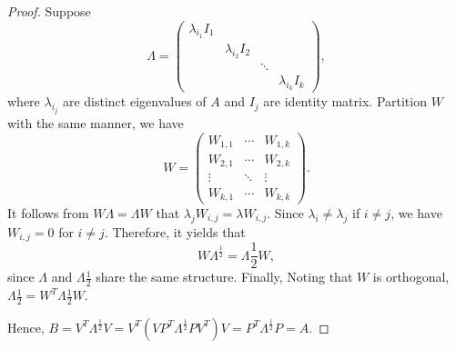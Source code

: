 \begin{proof}
Suppose 
\begin{equation*}
    \Lambda = \begin{pmatrix}
        \lambda_{i_1}I_1 &                  &        &                   \\
                         & \lambda_{i_2}I_2 &        &                   \\
                         &                  & \ddots &                   \\
                         &                  &        & \lambda_{i_k}I_k
    \end{pmatrix},
\end{equation*}
where $\lambda_{i_j}$ are distinct eigenvalues of $A$ and $I_j$ are 
identity matrix. Partition $W$ with the same manner, we have 
\begin{equation*}
    W = \begin{pmatrix}
        W_{1, 1}   &    \cdots    &  W_{1, k}         \\
        W_{2, 1}   &    \cdots    &  W_{2, k}         \\
        \vdots     &    \ddots    &  \vdots           \\
        W_{k, 1}   &    \cdots    &  W_{k, k}
    \end{pmatrix}.
\end{equation*}
It follows from $W \Lambda = \Lambda W$ that $\lambda_j W_{i, j} = \lambda
W_{i, j}$. Since $\lambda_i \neq \lambda_j$ if $i \neq j$, we have 
$W_{i, j} = 0$ for $i \neq j$. Therefore, it yields that 
\begin{equation}
    W\Lambda^\frac{1}{2} = \Lambda\frac{1}{2}W, 
\end{equation}
since $\Lambda$ and $\Lambda\frac{1}{2}$ share the same structure. Finally, 
Noting that $W$ is orthogonal, $\Lambda\frac{1}{2} = W^T \Lambda\frac{1}{2}
W$. 

Hence, $B = V^T \Lambda^\frac{1}{2} V 
= V^T (V P^T \Lambda^\frac{1}{2} PV^T) V
= P^T \Lambda^\frac{1}{2} P = A$.
\end{proof}